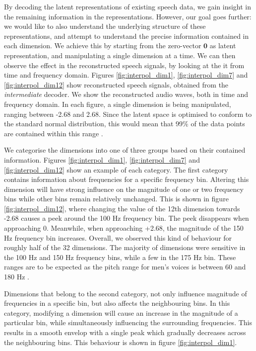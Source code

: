 		
		
		By decoding the latent representations of existing speech data, we gain insight in the remaining information in the representations. However, our goal goes further: we would like to also understand the underlying structure of these representations, and attempt to understand the precise information contained in each dimension. We achieve this by starting from the zero-vector $\textbf{0}$ as latent representation, and manipulating a single dimension at a time. We can then observe the effect in the reconstructed speech signals, by looking at the it from time and frequency domain. Figures \ref{fig:interpol_dim1}, \ref{fig:interpol_dim7} and \ref{fig:interpol_dim12} show reconstructed speech signals, obtained from the \textit{intermediate} decoder. We show the reconstructed audio waves, both in time and frequency domain. In each figure, a single dimension is being manipulated, ranging between -2.68 and 2.68. Since the latent space is optimised to conform to the standard normal distribution, this would mean that 99\% of the data points are contained within this range \cite{bhandariStandardNormalDistribution2020}.
		
		We categorise the dimensions into one of three groups based on their contained information. Figures \ref{fig:interpol_dim1}, \ref{fig:interpol_dim7} and \ref{fig:interpol_dim12} show an example of each category. The first category contains information about frequencies for a specific frequency bin. Altering this dimension will have strong influence on the magnitude of one or two frequency bins while other bins remain relatively unchanged. This is shown in figure \ref{fig:interpol_dim12}, where changing the value of the 12th dimension towards -2.68 causes a peek around the 100 Hz frequency bin. The peek disappears when approaching 0. Meanwhile, when approaching +2.68, the magnitude of the 150 Hz frequency bin increases. Overall, we observed this kind of behaviour for roughly half of the 32 dimensions. The majority of dimensions were sensitive in the 100 Hz and 150 Hz frequency bins, while a few in the 175 Hz bin. These ranges are to be expected as the pitch range for men's voices is between 60 and 180 Hz \cite{rePreferencesVeryLow2012}.
		
		Dimensions that belong to the second category, not only influence magnitude of frequencies in a specific bin, but also affects the neighbouring bins. In this category, modifying a dimension will cause an increase in the magnitude of a particular bin, while simultaneously influencing the surrounding frequencies. This results in a smooth envelop with a single peak which gradually decreases across the neighbouring bins. This behaviour is shown in figure \ref{fig:interpol_dim1}.
		
